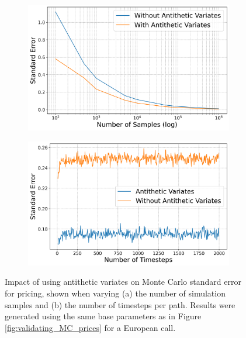 \begin{figure}[h]
    \centering

    \begin{subfigure}[b]{0.45\linewidth}
        \centering
        \includegraphics[width=\linewidth]{graphics/stderr_antithetic.png}
        \caption{}
        \label{fig:antithetic_vary_num_trials}
    \end{subfigure}
    \hfill
    \begin{subfigure}[b]{0.45\linewidth}
        \centering
        \includegraphics[width=\linewidth]{graphics/stderr_antithetic_with_n.png}
        \caption{}
        \label{fig:antithetic_vary_num_ts}
    \end{subfigure}

    \caption{Impact of using antithetic variates on Monte Carlo standard error for pricing, 
    shown when varying (a) the number of simulation samples and (b) the number of timesteps per path.
    Results were generated using the same base parameters as in Figure \ref{fig:validating_MC_prices} 
    for a European call.}
    \label{fig:std_errors_antithetic_compared}
\end{figure}

